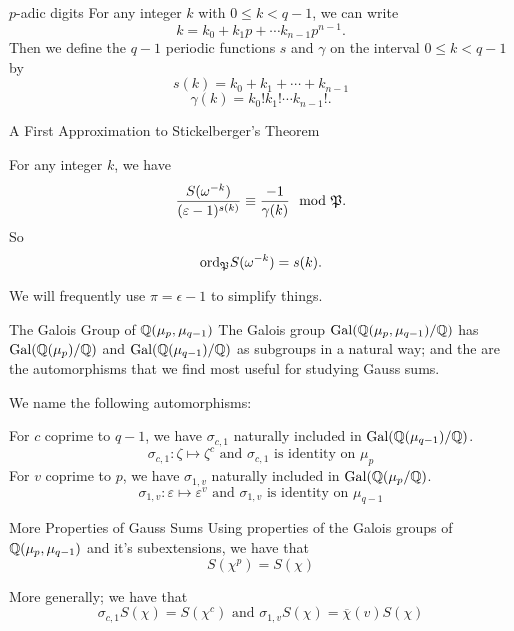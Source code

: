 \documentclass[presentation]{beamer}
\begin{document}
\begin{frame}{$p$-adic digits}
For any integer $k$ with $0 \leq k < q-1$, we can write \[k = k_0 + k_1 p + \cdots k_{n-1} p^{n-1}.\]
\pause
\vspace{0.5cm}
Then we define the $q-1$ periodic functions $s$ and $\gamma$ on the interval $0 \leq k < q-1$ by
\[s(k) = k_0 + k_1 + \cdots +k_{n-1} \]
\[\gamma(k) = k_0! k_1! \cdots k_{n-1}!.\]
\end{frame}

\begin{frame}{A First Approximation to Stickelberger's Theorem}
\begin{theorem}
For any integer $k$, we have \[\frac{S(\omega^{-k})}{(\varepsilon - 1)^{s(k)}} \equiv \frac{-1}{\gamma(k)} \mod {\mathfrak{P}}.\]
So \[\textrm{ord}_{\mathfrak{P}} S(\omega^{-k} )= s(k).\]
\end{theorem}

We will frequently use $\pi = \epsilon - 1$ to simplify things.
\end{frame}

\begin{frame}{The Galois Group of $\mathbb{Q}(\mu_p, \mu_{q-1})$}
The Galois group $\textrm{Gal}(\mathbb{Q}(\mu_p, \mu_{q-1})/\mathbb{Q})$ has $\textrm{Gal}(\mathbb{Q}(\mu_p)/\mathbb{Q})$ and $\textrm{Gal}(\mathbb{Q}(\mu_{q-1})/\mathbb{Q})$ as subgroups in a natural way; and the are the automorphisms that we find most useful for studying Gauss sums. 

We name the following automorphisms:\\
\pause
\vspace{0.5cm}

For $c$ coprime to $q-1$, we have $\sigma_{c,1}$ naturally included in $\textrm{Gal}(\mathbb{Q}(\mu_{q-1})/\mathbb{Q})$.
\[\sigma_{c,1} : \zeta \mapsto \zeta^c \text{ and } \sigma_{c,1} \text{ is identity on } \mu_p\]
\pause
\vspace{0.5cm}
For $v$ coprime to $p$, we have $\sigma_{1,v}$ naturally included in $\textrm{Gal}(\mathbb{Q}(\mu_{p}/\mathbb{Q})$.
\[\sigma_{1,v} : \varepsilon \mapsto \varepsilon^v \text{ and } \sigma_{1,v} \text{ is identity on } \mu_{q-1}\]
\end{frame}

\begin{frame}{More Properties of Gauss Sums }
Using properties of the Galois groups of $\mathbb{Q}(\mu_p, \mu_{q-1})$ and it's subextensions, we have that \[S(\chi^p) = S(\chi)\] 
\pause
\vspace{0.5cm}

More generally; we have that \[\sigma_{c,1}S(\chi) = S(\chi^c) \text{ and } \sigma_{1,v} S(\chi) = \overline{\chi}(v)S(\chi)\]
\end{frame}
\end{document}
